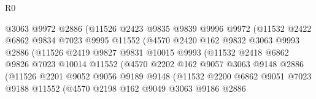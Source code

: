 \begin{lexlean}{R0}
\begin{coremodule}
                          @3063
                          @9972
                          @2886
                          (@11526
                            @2423
                            @9835
                            @9839
                            @9996
                            @9972
                            (@11532
                              @2422
                              @6862
                              @9834
                              @7023
                              @9995
                              @11552
                              (@4570
                                @2420
                                @162
                                @9832
                                @3063
                                @9993
                                @2886
                                (@11526
                                  @2419
                                  @9827
                                  @9831
                                  @10015
                                  @9993
                                  (@11532
                                    @2418
                                    @6862
                                    @9826
                                    @7023
                                    @10014
                                    @11552
                                    (@4570
                                      @2202
                                      @162
                                      @9057
                                      @3063
                                      @9148
                                      @2886
                                      (@11526
                                        @2201
                                        @9052
                                        @9056
                                        @9189
                                        @9148
                                        (@11532
                                          @2200
                                          @6862
                                          @9051
                                          @7023
                                          @9188
                                          @11552
                                          (@4570
                                            @2198
                                            @162
                                            @9049
                                            @3063
                                            @9186
                                            @2886

\end{coremodule}
\end{lexlean}
